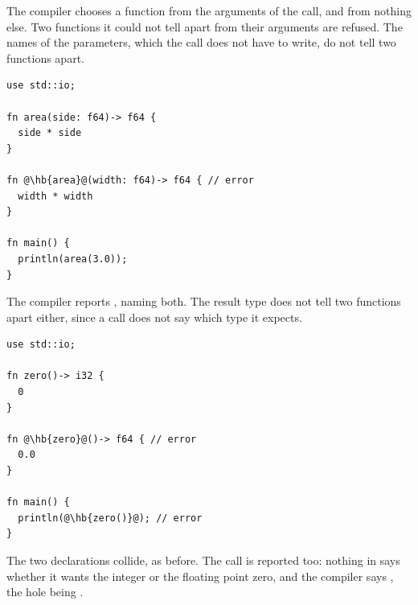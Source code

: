 The compiler chooses a function from the arguments of the call, and from nothing
else. Two functions it could not tell apart from their arguments are refused.
The names of the parameters, which the call does not have to write, do not tell
two functions apart.

\begin{lstlisting}[style=coloredverbatimError, escapechar=@, caption=Two functions that differ only by the names of their parameters]
use std::io;

fn area(side: f64)-> f64 {
  side * side
}

fn @\hb{area}@(width: f64)-> f64 { // error
  width * width
}

fn main() {
  println(area(3.0));
}
\end{lstlisting}

The compiler reports , naming both. The result
type does not tell two functions apart either, since a call does not say which
type it expects.

\begin{lstlisting}[style=coloredverbatimError, escapechar=@, caption=Two functions that differ only by their result]
use std::io;

fn zero()-> i32 {
  0
}

fn @\hb{zero}@()-> f64 { // error
  0.0
}

fn main() {
  println(@\hb{zero()}@); // error
}
\end{lstlisting}

The two declarations collide, as before. The call is reported too: nothing in
 says whether it wants the integer or the floating point zero, and
the compiler says , the hole being .

